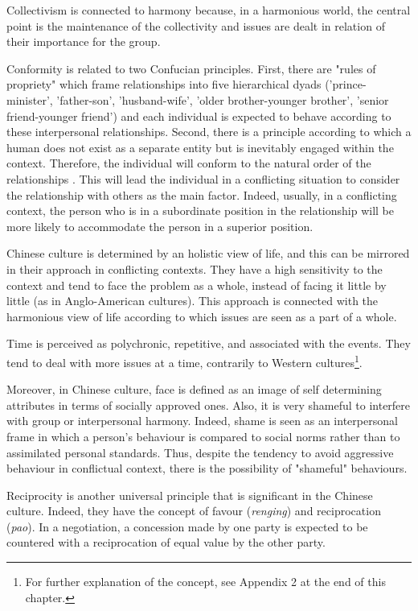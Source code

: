 \documentclass[../main.tex]{subfiles}
\begin{document}
Collectivism is connected to harmony because, in a harmonious world, the central point is the maintenance of the collectivity and issues are dealt in relation of their importance for the group.

Conformity is related to two Confucian principles. First, there are "rules of propriety" which frame relationships into five hierarchical dyads ('prince-minister', 'father-son', 'husband-wife', 'older brother-younger brother', 'senior friend-younger friend') and each individual is expected to behave according to these interpersonal relationships. Second, there is a principle according to which a human does not exist as a separate entity but is inevitably engaged within the context. Therefore, the individual will conform to the natural order of the relationships \autocite[367-368]{tang}. This will lead the individual in a conflicting situation to consider the relationship with others as the main factor. Indeed, usually, in a conflicting context, the person who is in a subordinate position in the relationship will be more likely to accommodate the person in a superior position.

Chinese culture is determined by an holistic view of life, and this can be mirrored in their approach in conflicting contexts. They have a high sensitivity to the context and tend to face the problem as a whole, instead of facing it little by little (as in Anglo-American cultures). This approach is connected with the harmonious view of life according to which issues are seen as a part of a whole.

Time is perceived as polychronic, repetitive, and associated with the events. They tend to deal with more issues at a time, contrarily to Western cultures\footnote{For further explanation of the concept, see Appendix 2 at the end of this chapter.}. 

Moreover, in Chinese culture, face is defined as an image of self determining attributes in terms of socially approved ones. Also, it is very shameful to interfere with group or interpersonal harmony. Indeed, shame is seen as an interpersonal frame in which a person's behaviour is compared to social norms rather than to assimilated personal standards. Thus, despite the tendency to avoid aggressive behaviour in conflictual context, there is the possibility of "shameful" behaviours.

Reciprocity is another universal principle that is significant in the Chinese culture. Indeed, they have the concept of favour (\textit{renging}) and reciprocation (\textit{pao}). In a negotiation, a concession made by one party is expected to be countered with a reciprocation of equal value by the other party.
\end{document}
